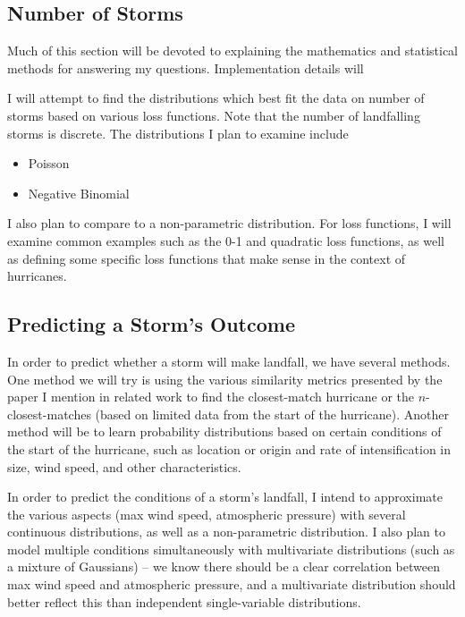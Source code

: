 
\subsection{Number of Storms}

\par
Much of this section will be devoted to explaining the mathematics and statistical methods for answering my questions. Implementation details will 

\par
I will attempt to find the distributions which best fit the data on number of storms based on various loss functions.
Note that the number of landfalling storms is discrete.
The distributions I plan to examine include
\begin{itemize}
	\item Poisson
	\item Negative Binomial
\end{itemize}
I also plan to compare to a non-parametric distribution.
For loss functions, I will examine common examples such as the 0-1 and quadratic loss functions, as well as defining some specific loss functions that make sense in the context of hurricanes.

\subsection{Predicting a Storm's Outcome}

\par
In order to predict whether a storm will make landfall, we have several methods.
One method we will try is using the various similarity metrics presented by the paper I mention in related work to find the closest-match hurricane or the $n$-closest-matches (based on limited data from the start of the hurricane).
Another method will be to learn probability distributions based on certain conditions of the start of the hurricane, such as location or origin and rate of intensification in size, wind speed, and other characteristics.

\par
In order to predict the conditions of a storm's landfall, I intend to approximate the various aspects (max wind speed, atmospheric pressure) with several continuous distributions, as well as a non-parametric distribution.
I also plan to model multiple conditions simultaneously with multivariate distributions (such as a mixture of Gaussians) -- we know there should be a clear correlation between max wind speed and atmospheric pressure, and a multivariate distribution should better reflect this than independent single-variable distributions.


